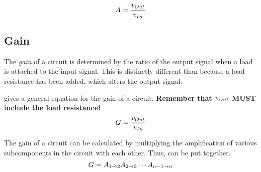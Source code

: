 \begin{equation}\label{eq:Amplification}
  \Amp{} = \frac{\ACVoltage{\Out}}{\ACVoltage{\In}}
\end{equation}

\subsection{Gain}\label{subsec:Gain}
The \emph{gain} of a circuit is determined by the ratio of the output signal when a load is attached to the input signal.
This is distinctly different than  because a load resistance has been added, which alters the output signal.

 gives a general equation for the gain of a circuit.
\textbf{Remember that $\ACVoltage{\Out}$ MUST include the load resistance!}
\begin{equation}\label{eq:Gain}
  \Gain{} = \frac{\ACVoltage{\Out}}{\ACVoltage{\In}}
\end{equation}

The gain of a circuit can be calculated by multiplying the amplification of various subcomponents in the circuit with each other.
Thus,  can be put together.
\begin{equation}\label{eq:Gain-Broken}
  G_{} = A_{1 \to 2} A_{2 \to 3} \cdots A_{n-1 \to n}
\end{equation}

